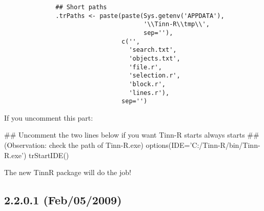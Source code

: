 \begin{itemize}
\begin{itemize}
{{\begin{verbatim}
              ## Short paths                                                                   
              .trPaths <- paste(paste(Sys.getenv('APPDATA'),                                   
                                      '\\Tinn-R\\tmp\\',
                                      sep=''),
                                c('',
                                  'search.txt',
                                  'objects.txt',
                                  'file.r',
                                  'selection.r',
                                  'block.r',
                                  'lines.r'),
                                sep='')
            \end{verbatim}
          } %
        } %

        If you uncomment this part:

        \begin{Scode}
          ## Uncomment the two lines below if you want Tinn-R starts always \RR{} starts
          ## (Observation: check the path of Tinn-R.exe)
          options(IDE='C:/Tinn-R/bin/Tinn-R.exe')
          trStartIDE()
        \end{Scode}

        The new TinnR package will do the job!
    \end{itemize}
\end{itemize}


\subsection{2.2.0.1 (Feb/05/2009)}

